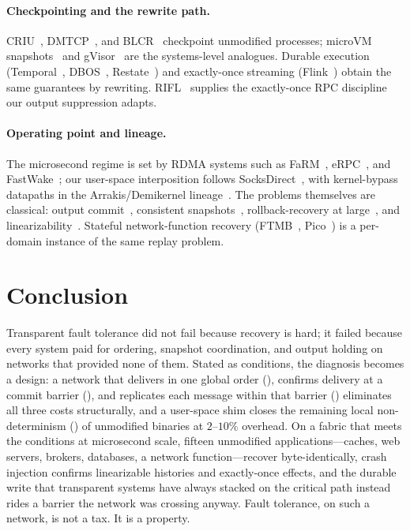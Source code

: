\paragraph{Checkpointing and the rewrite path.} CRIU~\citep{criu},
DMTCP~\citep{ansel2009dmtcp}, and BLCR~\citep{hargrove2006blcr} checkpoint
unmodified processes; microVM snapshots~\citep{agache2020firecracker,
ustiugov2021reap} and gVisor~\citep{gvisor} are the systems-level
analogues. Durable execution (Temporal~\citep{temporal},
DBOS~\citep{skiadopoulos2021dbos}, Restate~\citep{restate}) and exactly-once
streaming (Flink~\citep{carbone2015flink}) obtain the same guarantees by
rewriting. RIFL~\citep{lee2015rifl} supplies the exactly-once RPC
discipline our output suppression adapts.

\paragraph{Operating point and lineage.} The microsecond regime is set by
RDMA systems such as FaRM~\citep{dragojevic2014farm},
eRPC~\citep{kalia2019erpc}, and FastWake~\citep{li2023fastwake}; our
user-space interposition follows
SocksDirect~\citep{li2019socksdirect}, with kernel-bypass datapaths in the
Arrakis/Demikernel lineage~\citep{peter2014arrakis,zhang2021demikernel}.
The problems themselves are classical: output
commit~\citep{strom1985optimistic}, consistent
snapshots~\citep{chandy1985snapshots}, rollback-recovery at
large~\citep{elnozahy2002survey}, and
linearizability~\citep{herlihy1990linearizability}. Stateful
network-function recovery (FTMB~\citep{sherry2015ftmb},
Pico~\citep{rajagopalan2013pico}) is a per-domain instance of the same
replay problem.

\section{Conclusion}
\label{sec:conclusion}

Transparent fault tolerance did not fail because recovery is hard; it
failed because every system paid for ordering, snapshot coordination, and
output holding on networks that provided none of them. Stated as
conditions, the diagnosis becomes a design: a network that delivers in one
global order (\Order), confirms delivery at a commit barrier (\Barrier),
and replicates each message within that barrier (\Durability) eliminates
all three costs structurally, and a user-space shim closes the remaining
local non-determinism (\Determinism) of unmodified binaries at
$2$--$10\%$ overhead. On a
fabric that meets the conditions at microsecond scale, fifteen unmodified
applications---caches, web servers, brokers, databases, a network
function---recover byte-identically, crash injection confirms linearizable
histories and exactly-once effects, and the durable write that transparent
systems have always stacked on the critical path instead rides a barrier
the network was crossing anyway.
Fault tolerance, on such a network, is not a tax. It is a property.

